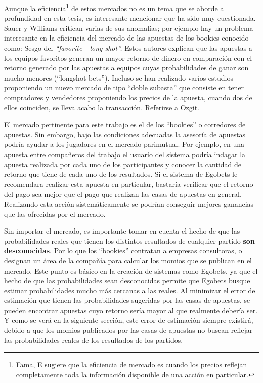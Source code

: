  Aunque la eficiencia\footnote{Fama, E \cite{fama1998market} sugiere que la eficiencia de mercado es cuando los precios reflejan completamente toda la información disponible de una acción en particular.} de estos mercados no es un tema que se aborde a profundidad en esta tesis, es interesante mencionar que ha sido  muy cuestionada. Sauer \cite{sauer1998economics} y Williams \cite{williams1999information} critican varias de sus anomalías; por ejemplo hay un problema interesante en la eficiencia del mercado de las apuestas de los bookies conocido como: Sesgo del \emph{``favorite - long shot''.} Estos autores explican que las apuestas a los equipos favoritos generan un mayor retorno de dinero en comparación con el retorno generado por las apuestas a equipos cuyas probabilidades de ganar son mucho menores (``longshot bets''). Incluso se han realizado varios estudios proponiendo un nuevo mercado de tipo ``doble subasta'' que consiste en tener compradores y vendedores proponiendo los precios de la apuesta, cuando dos de ellos coinciden, se lleva acabo la transacción. Referirse a Ozgit\cite{ozgit2005posted}.

 El mercado pertinente para este trabajo es el de los ``bookies'' o corredores de apuestas. Sin embargo, bajo las condiciones adecuadas la asesoría de apuestas podría ayudar a los jugadores en el mercado parimutual. Por ejemplo, en una apuesta entre compañeros del trabajo el usuario del sistema podría indagar la apuesta realizada por cada uno de los participantes y conocer la cantidad de retorno que tiene de cada uno de los resultados. Si el sistema de Egobets le recomendara realizar esta apuesta en particular, bastaría verificar que el retorno del pago sea mejor que el pago que realizan las casas de apuestas en general. Realizando esta acción sistemáticamente se podrían conseguir mejores ganancias que las ofrecidas por el mercado.

 Sin importar el mercado, es importante tomar en cuenta el hecho de que las probabilidades reales que tienen los distintos resultados de cualquier partido \textbf{son desconocidas}. Por lo que los ``bookies'' contratan a empresas consultoras, o designan un área de la compañía para calcular los momios que se publican en el mercado. Este punto es básico en la creación de sistemas como Egobets, ya que el hecho de que las probabilidades sean desconocidas permite que Egobets busque estimar probabilidades mucho más cercanas a las reales. Al minimizar el error de estimación que tienen las probabilidades sugeridas por las casas de apuestas, se pueden encontrar apuestas cuyo retorno sería mayor al que realmente debería ser. Y como se verá en la siguiente sección, este error de estimación siempre existirá, debido a que los momios publicados por las casas de apuestas no buscan reflejar las probabilidades reales de los resultados de los partidos.

